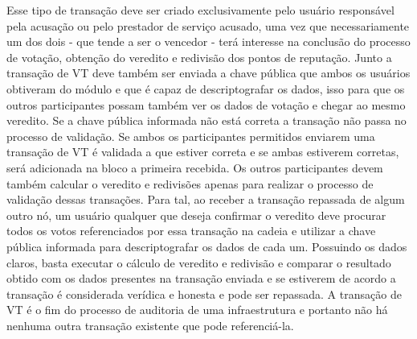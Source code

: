 %

%
Esse tipo de transação deve ser criado exclusivamente pelo usuário responsável pela acusação ou pelo prestador de serviço acusado, uma vez que necessariamente um dos dois - que tende a ser o vencedor - terá interesse na conclusão do processo de votação, obtenção do veredito e redivisão dos pontos de reputação. Junto a transação de \ac{VT} deve também ser enviada a chave pública que ambos os usuários obtiveram do módulo e que é capaz de descriptografar os dados, isso para que os outros participantes possam também ver os dados de votação e chegar ao mesmo veredito. Se a chave pública informada não está correta a transação não passa no processo de validação. Se ambos os participantes permitidos enviarem uma transação de \ac{VT} é validada a que estiver correta e se ambas estiverem corretas, será adicionada na bloco a primeira recebida. Os outros participantes devem também calcular o veredito e redivisões apenas para realizar o processo de validação dessas transações. Para tal, ao receber a transação repassada de algum outro nó, um usuário qualquer que deseja confirmar o veredito deve procurar todos os votos referenciados por essa transação na cadeia e utilizar a chave pública informada para descriptografar os dados de cada um. Possuindo os dados claros, basta executar o cálculo de veredito e redivisão e comparar o resultado obtido com os dados presentes na transação enviada e se estiverem de acordo a transação é considerada verídica e honesta e pode ser repassada. A transação de \ac{VT} é o fim do processo de auditoria de uma infraestrutura e portanto não há nenhuma outra transação existente que pode referenciá-la.

